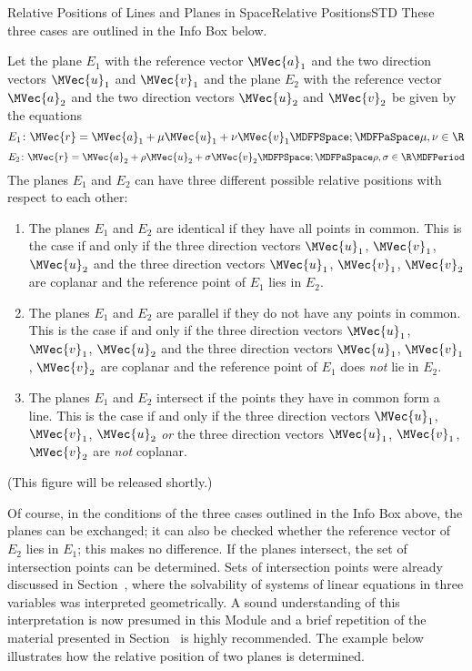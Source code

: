 \begin{MXContent}{Relative Positions of Lines and Planes in Space}{Relative Positions}{STD}
These three cases are outlined in the Info Box below.

\begin{MInfo}
Let the plane $E_1$ with the reference vector $\MVec{a}_1$ and the two direction vectors 
$\MVec{u}_1$ and $\MVec{v}_1$ and the plane $E_2$ with the reference vector $\MVec{a}_2$ and the 
two direction vectors $\MVec{u}_2$ and $\MVec{v}_2$ be given by the equations
\[
 E_1\colon \MVec{r}=\MVec{a}_1+\mu\MVec{u}_1+\nu\MVec{v}_1\MDFPSpace;\MDFPaSpace\mu,\nu\in\R
\]
\[
 E_2\colon \MVec{r}=\MVec{a}_2+\rho\MVec{u}_2+\sigma\MVec{v}_2\MDFPSpace;\MDFPaSpace\rho,\sigma\in\R\MDFPeriod
\]
The planes $E_1$ and $E_2$ can have three different possible relative positions with respect to each other:
\begin{enumerate}
 \item The planes $E_1$ and $E_2$ are identical if they have all points in common. This is the case if and only if the three direction vectors $\MVec{u}_1$, $\MVec{v}_1$, $\MVec{u}_2$ and the three direction vectors $\MVec{u}_1$, $\MVec{v}_1$, $\MVec{v}_2$ are coplanar and the reference point of $E_1$ lies in $E_2$.  
 \item The planes $E_1$ and $E_2$ are parallel if they do not have any points in common. This is the case if and only if the three direction vectors $\MVec{u}_1$, $\MVec{v}_1$, $\MVec{u}_2$ and the three direction vectors $\MVec{u}_1$, $\MVec{v}_1$, $\MVec{v}_2$ are coplanar and the reference point of $E_1$ does \textit{not} lie in $E_2$. 
 \item The planes $E_1$ and $E_2$ intersect if the points they have in common form a line. This is the case if and only if the three direction vectors $\MVec{u}_1$, $\MVec{v}_1$, $\MVec{u}_2$ \textit{or} the three direction vectors $\MVec{u}_1$, $\MVec{v}_1$, $\MVec{v}_2$ are \textit{not} coplanar. 
\end{enumerate}

(This figure will be released shortly.)

\end{MInfo}

Of course, in the conditions of the three cases outlined in the Info Box above, the planes can be exchanged; 
it can also be checked whether the reference vector of $E_2$ lies in $E_1$; this makes no difference. If the planes intersect, 
the set of intersection points can be determined. Sets of intersection points were already discussed in Section~, where 
the solvability of systems of linear equations in three variables was interpreted geometrically. A sound understanding
of this interpretation is now presumed in this Module and a brief repetition of the material presented in Section~ is 
highly recommended. The example below illustrates how the relative position of two planes is determined.


\end{MXContent}
